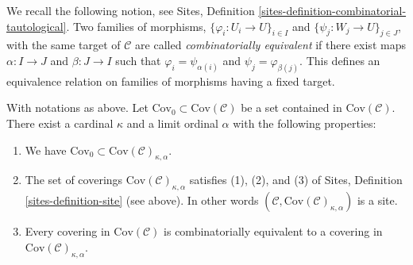 \medskip\noindent
We recall the following notion, see Sites, Definition
\ref{sites-definition-combinatorial-tautological}.
Two families of morphisms, $\{\varphi_i : U_i \to U\}_{i\in I}$ and
$\{\psi_j : W_j \to U\}_{j\in J}$, with the same target of $\mathcal{C}$ are
called {\it combinatorially equivalent} if there exist maps
$\alpha : I \to J$ and $\beta : J\to I$ such that
$\varphi_i = \psi_{\alpha(i)}$ and $\psi_j = \varphi_{\beta(j)}$.
This defines an equivalence relation on families of morphisms
having a fixed target.

\begin{lemma}
\label{lemma-coverings-site}
With notations as above.
Let $\text{Cov}_0 \subset \text{Cov}(\mathcal{C})$
be a set contained in $\text{Cov}(\mathcal{C})$.
There exist a cardinal $\kappa$ and a limit ordinal $\alpha$
with the following properties:
\begin{enumerate}
\item We have $\text{Cov}_0 \subset \text{Cov}(\mathcal{C})_{\kappa, \alpha}$.
\item The set of coverings
$\text{Cov}(\mathcal{C})_{\kappa, \alpha}$ satisfies
(1), (2), and (3) of Sites, Definition \ref{sites-definition-site} (see above).
In other words $(\mathcal{C}, \text{Cov}(\mathcal{C})_{\kappa, \alpha})$
is a site.
\item Every covering in $\text{Cov}(\mathcal{C})$
is combinatorially equivalent
to a covering in $\text{Cov}(\mathcal{C})_{\kappa, \alpha}$.
\end{enumerate}
\end{lemma}

